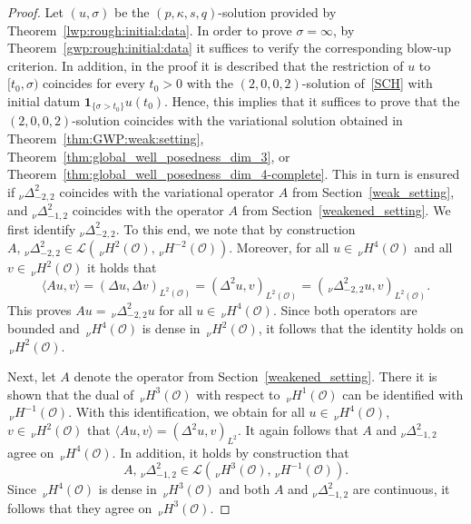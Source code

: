 \documentclass[reqno]{amsart}
\newcommand{\sL}{\mathscr{L}}
\newcommand{\sO}{\mathscr{O}}
\newcommand{\1}{\mathbf{1}}
\newcommand{\nH}{\ensuremath{\,_\nu H}}
\newcommand{\bpsn}[1]{\ensuremath{\nH^{#1}(\sO)}}
\begin{document}
    \begin{proof}
    Let $(u,\sigma)$ be the $(p,\kappa,s,q)$-solution provided by Theorem~\ref{lwp:rough:initial:data}. In order to prove $\sigma=\infty$, by  Theorem~\ref{gwp:rough:initial:data} it suffices to verify the corresponding blow-up criterion. In addition, in the proof it is described that the restriction of $u$ to $[t_0,\sigma)$ coincides for every $t_0>0$ with the $(2,0,0,2)$-solution of~\eqref{SCH} with initial datum $\1_{\{\sigma>t_0\}} u(t_0)$. Hence, this implies that it suffices to prove that the $(2,0,0,2)$-solution coincides with the variational solution obtained in Theorem~\ref{thm:GWP:weak:setting}, Theorem~\ref{thm:global_well_posedness_dim_3}, or Theorem~\ref{thm:global_well_posedness_dim_4-complete}. 
        This in turn is ensured if  $_\nu\Delta_{-2,2}^2$ coincides with the variational operator $A$ from Section~\ref{weak_setting}, and  $_\nu\Delta_{-1,2}^2$ coincides with the operator $A$ from Section~\ref{weakened_setting}.
        We first identify $_\nu\Delta^2_{-2,2}$. To this end, we note that by construction
        $ A,\,_\nu\Delta_{-2,2}^2\in \sL(\bpsn{2},\bpsn{-2}).$
        Moreover, for all $u\in \bpsn{4}$ and all $v\in \bpsn{2}$ it holds that 
        $$\langle Au,v\rangle=(\Delta u, \Delta v)_{L^2(\sO)}= (\Delta^2 u,v)_{L^2(\sO)}=(\,_\nu\Delta_{-2,2}^2 u,v)_{L^2(\sO)}.$$
        This proves $A u = \,_\nu\Delta^2_{-2,2}u$ for all $u\in \bpsn{4}$. Since both operators are bounded and $\bpsn{4}$ is dense in $\bpsn{2}$, it follows that the identity holds on $\bpsn{2}$.

        Next, let $A$ denote the operator from Section~\ref{weakened_setting}. There it is shown that the dual of $\bpsn{3}$ with respect to $\bpsn{1}$ can be identified with $\bpsn{-1}$. With this identification, we obtain for all $u\in\bpsn{4}$, $v\in \bpsn{2}$  that            $\langle A u,v\rangle =(\Delta^2 u,v)_{L^2}$. It again follows that $A$ and $_\nu\Delta_{-1,2}^2$ agree on $\bpsn{4}$.
In addition, it holds by construction that        $$A, \,_\nu\Delta_{-1,2}^2 \in \sL(\bpsn{3},\bpsn{-1}).$$
Since $\bpsn{4}$ is dense in $\bpsn{3}$ and both $A$ and $_\nu\Delta_{-1,2}^2$ are continuous, it follows that they agree on $\bpsn{3}$.
    \end{proof}
\end{document}
